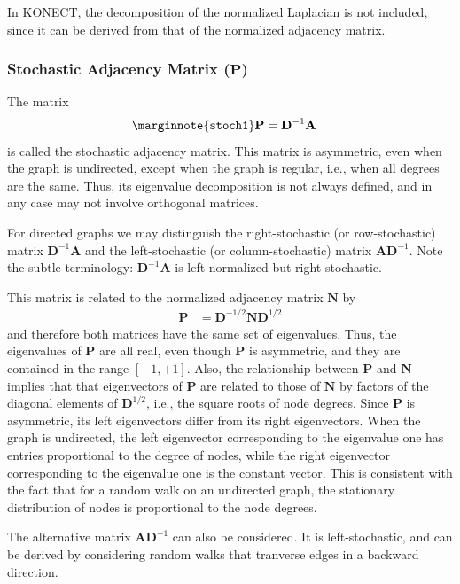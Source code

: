 \documentclass{article}
\begin{document}
In KONECT, the decomposition of the normalized Laplacian is not
included, since it can be derived from that of the normalized adjacency
matrix. 

\subsubsection{Stochastic Adjacency Matrix ($\mathbf P$)}
The matrix
\begin{align*}
  \marginnote{\texttt{stoch1}}
  \mathbf P &= \mathbf D^{-1} \mathbf A
\end{align*}
is called the stochastic adjacency matrix.  This matrix is asymmetric,
even when the graph is undirected, except when the graph is regular,
i.e., when all degrees are the same.  
Thus, its eigenvalue decomposition
is not always defined, and in any case may not involve orthogonal
matrices. 

For directed graphs we may distinguish the right-stochastic (or
row-stochastic) matrix 
$\mathbf D^{-1} \mathbf A$ and the left-stochastic (or column-stochastic)
matrix $\mathbf A \mathbf D^{-1}$.  Note the subtle terminology:
$\mathbf D^{-1} \mathbf A$ is left-normalized but right-stochastic. 

This matrix is related to the normalized adjacency matrix $\mathbf N$ by
\begin{align*}
  \mathbf P &= \mathbf D^{-1/2} \mathbf N \mathbf D^{1/2}
\end{align*}
and therefore both matrices have the same set of eigenvalues.
Thus, the eigenvalues of $\mathbf P$ are all real, even though
$\mathbf P$ is asymmetric, and they are contained in the range $[-1,+1]$. 
Also, the relationship between $\mathbf P$ and $\mathbf N$ implies that that
eigenvectors of $\mathbf P$ are related to those of 
$\mathbf N$ by factors of the diagonal elements of $\mathbf D^{1/2}$,
i.e., the square roots of node degrees. 
Since $\mathbf P$ is asymmetric, its left eigenvectors differ from its
right eigenvectors.  When the graph is undirected, the left eigenvector
corresponding to the eigenvalue one has entries proportional to the
degree of nodes, 
while the right eigenvector corresponding to the eigenvalue one 
is the constant vector.  This is consistent with the fact that for a
random walk on an undirected graph, the stationary distribution of nodes
is proportional to the node degrees. 

The alternative matrix $\mathbf A \mathbf D^{-1}$ can also be
considered.  It is left-stochastic, and
can be derived by considering random walks that tranverse edges in a
backward direction. 
\end{document}
